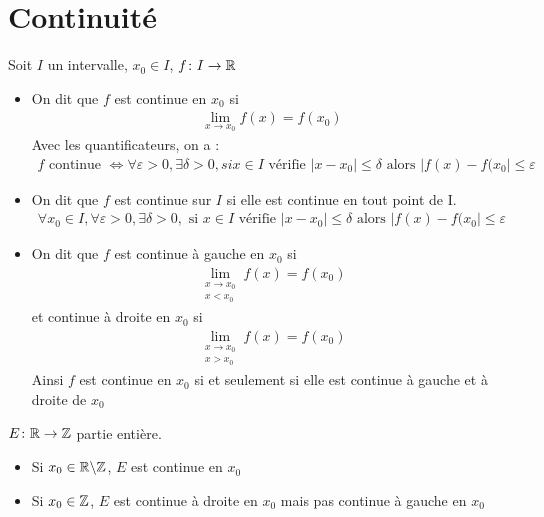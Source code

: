 \section{Continuité}
\begin{graybox}
\begin{definition}
Soit $I$ un intervalle, $x_0 \in I$, $f \colon I \to \mathbb{R}$
\begin{itemize}
\item On dit que $f$ est continue en $x_0$ si 
\begin{align*}
\lim_{x \to x_0} f(x) = f(x_0)
\end{align*}
Avec les quantificateurs, on a :
\begin{align*}
f \text{ continue } \iff \forall \varepsilon > 0, \exists \delta > 0, si x \in I \text{ vérifie } |x - x_0 | \leq \delta \text{ alors } |f(x) - f(x_0| \leq \varepsilon
\end{align*}
\item On dit que $f$ est continue sur $I$ si elle est continue en tout point de I.
\begin{align*}
\forall x_0 \in I, \forall \varepsilon > 0, \exists \delta > 0, \text{ si } x \in I \text{ vérifie } |x - x_0| \leq \delta \text{ alors } |f(x) - f(x_0| \leq \varepsilon
\end{align*}
\item On dit que $f$ est continue à gauche en $x_0$ si 
\begin{align*}
\lim_{\substack{x \to x_0 \\ x < x_0}} f(x) = f(x_0)
\end{align*}
et continue à droite en $x_0$ si
\begin{align*}
\lim_{\substack{x \to x_0 \\ x > x_0}} f(x) = f(x_0)
\end{align*}
Ainsi $f$ est continue en $x_0$ si et seulement si elle est continue à gauche et à droite de $x_0$
\end{itemize}
\end{definition} 
\end{graybox}

\begin{exemple}
$E \colon \mathbb{R} \to \mathbb{Z}$ partie entière.
\begin{itemize}
\item Si $x_0 \in \mathbb{R} \backslash \mathbb{Z}$, $E$ est continue en $x_0$
\item Si $x_0 \in \mathbb{Z}$, $E$ est continue à droite en $x_0$ mais pas continue à gauche en $x_0$
\end{itemize}
\end{exemple}